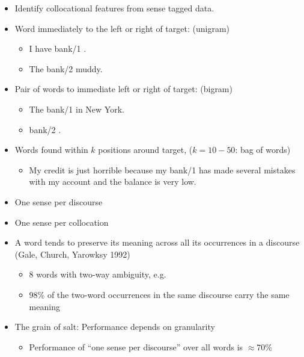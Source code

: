 \documentclass[a4paper,landscape,headrule,footrule,xetex]{foils}
\begin{document}
\begin{itemize}
\item Identify collocational features from sense tagged data.
\item Word immediately to the left or right of target: (unigram)
  \begin{itemize}
  \item I have  bank/1 .
  \item The  bank/2  muddy.
  \end{itemize}
\item  Pair of words to immediate left or right of target: (bigram)
  \begin{itemize}
  \item The  bank/1  in New York.
  \item {} bank/2 .
  \end{itemize}
\item Words found within $k$ positions around target, ($k = 10-50$: bag of words)
  \begin{itemize}
  \item 
My credit is just horrible because my bank/1 has made several mistakes with my account and the balance is very low. 
\end{itemize}
\end{itemize}


\begin{itemize}
\item One sense per discourse
\item One sense per collocation
\end{itemize}

\begin{itemize}
\item A word tends to preserve its meaning across all its occurrences in a discourse (Gale, Church, Yarowksy 1992)
  \begin{itemize}
  \item 8 words with two-way ambiguity, e.g. 
  \item 98\% of the two-word occurrences in the same discourse carry the same meaning
  \end{itemize}
\item The grain of salt: Performance depends on granularity
  \begin{itemize}
  \item Performance of ``one sense per discourse'' over all words is $\approx 70\%$
  \end{itemize}
\end{itemize}
\end{document}
